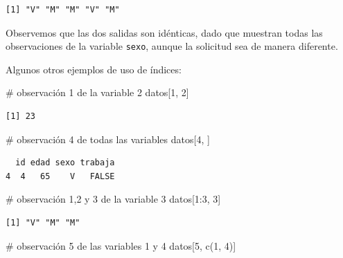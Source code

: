\documentclass[
  spanish,
  a4paper,
]{scrbook}
\newenvironment{Shaded}{\begin{snugshade}}{\end{snugshade}}
\newcommand{\CommentTok}[1]{\textcolor[rgb]{0.37,0.37,0.37}{#1}}
\newcommand{\DecValTok}[1]{\textcolor[rgb]{0.68,0.00,0.00}{#1}}
\newcommand{\FunctionTok}[1]{\textcolor[rgb]{0.28,0.35,0.67}{#1}}
\newcommand{\NormalTok}[1]{\textcolor[rgb]{0.00,0.23,0.31}{#1}}
\newcommand{\SpecialCharTok}[1]{\textcolor[rgb]{0.37,0.37,0.37}{#1}}
\begin{document}
\begin{verbatim}
[1] "V" "M" "M" "V" "M"
\end{verbatim}

Observemos que las dos salidas son idénticas, dado que muestran todas
las observaciones de la variable \texttt{sexo}, aunque la solicitud sea
de manera diferente.

Algunos otros ejemplos de uso de índices:

\begin{Shaded}
\begin{Highlighting}[]
\CommentTok{\# observación 1 de la variable 2}
\NormalTok{datos[}\DecValTok{1}\NormalTok{, }\DecValTok{2}\NormalTok{]}
\end{Highlighting}
\end{Shaded}

\begin{verbatim}
[1] 23
\end{verbatim}

\begin{Shaded}
\begin{Highlighting}[]
\CommentTok{\# observación 4 de todas las variables}
\NormalTok{datos[}\DecValTok{4}\NormalTok{, ]}
\end{Highlighting}
\end{Shaded}

\begin{verbatim}
  id edad sexo trabaja
4  4   65    V   FALSE
\end{verbatim}

\begin{Shaded}
\begin{Highlighting}[]
\CommentTok{\# observación 1,2 y 3 de la variable 3}
\NormalTok{datos[}\DecValTok{1}\SpecialCharTok{:}\DecValTok{3}\NormalTok{, }\DecValTok{3}\NormalTok{]}
\end{Highlighting}
\end{Shaded}

\begin{verbatim}
[1] "V" "M" "M"
\end{verbatim}

\begin{Shaded}
\begin{Highlighting}[]
\CommentTok{\# observación 5 de las variables 1 y 4}
\NormalTok{datos[}\DecValTok{5}\NormalTok{, }\FunctionTok{c}\NormalTok{(}\DecValTok{1}\NormalTok{, }\DecValTok{4}\NormalTok{)]}
\end{Highlighting}
\end{Shaded}
\end{document}
